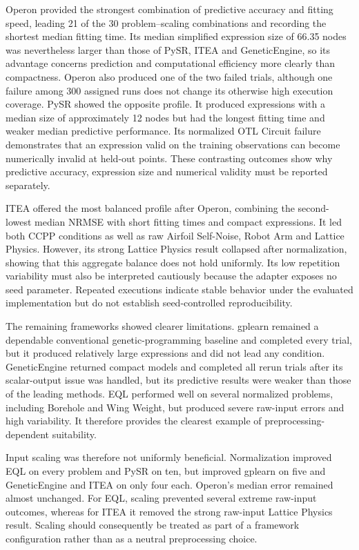 \documentclass[12pt,oneside,bibtotoc,liststotoc]{scrbook}
\begin{document}
Operon provided the strongest combination of predictive accuracy and fitting speed, leading 21 of the 30 problem--scaling combinations and recording the shortest median fitting time. Its median simplified expression size of 66.35 nodes was nevertheless larger than those of PySR, ITEA and GeneticEngine, so its advantage concerns prediction and computational efficiency more clearly than compactness. Operon also produced one of the two failed trials, although one failure among 300 assigned runs does not change its otherwise high execution coverage. PySR showed the opposite profile. It produced expressions with a median size of approximately 12 nodes but had the longest fitting time and weaker median predictive performance. Its normalized OTL Circuit failure demonstrates that an expression valid on the training observations can become numerically invalid at held-out points. These contrasting outcomes show why predictive accuracy, expression size and numerical validity must be reported separately.

ITEA offered the most balanced profile after Operon, combining the second-lowest median NRMSE with short fitting times and compact expressions. It led both CCPP conditions as well as raw Airfoil Self-Noise, Robot Arm and Lattice Physics. However, its strong Lattice Physics result collapsed after normalization, showing that this aggregate balance does not hold uniformly. Its low repetition variability must also be interpreted cautiously because the adapter exposes no seed parameter. Repeated executions indicate stable behavior under the evaluated implementation but do not establish seed-controlled reproducibility.

The remaining frameworks showed clearer limitations. gplearn remained a dependable conventional genetic-programming baseline and completed every trial, but it produced relatively large expressions and did not lead any condition. GeneticEngine returned compact models and completed all rerun trials after its scalar-output issue was handled, but its predictive results were weaker than those of the leading methods. EQL performed well on several normalized problems, including Borehole and Wing Weight, but produced severe raw-input errors and high variability. It therefore provides the clearest example of preprocessing-dependent suitability.

Input scaling was therefore not uniformly beneficial. Normalization improved EQL on every problem and PySR on ten, but improved gplearn on five and GeneticEngine and ITEA on only four each. Operon's median error remained almost unchanged. For EQL, scaling prevented several extreme raw-input outcomes, whereas for ITEA it removed the strong raw-input Lattice Physics result. Scaling should consequently be treated as part of a framework configuration rather than as a neutral preprocessing choice.
\end{document}

